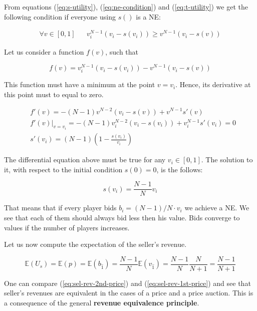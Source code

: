 From equations (\ref{eq:s-utility}), (\ref{eq:ne-condition}) and (\ref{eq:t-utility}) we get the following condition if everyone using $s()$ is a NE:

\begin{equation}
\begin{aligned}
	\forall v \in [0, 1] & & v_i^{N-1}(v_i-s(v_i)) \ge v^{N-1}(v_i-s(v))
\end{aligned}
\end{equation}

Let us consider a function $f(v)$, such that

\begin{equation}
f(v) = v_i^{N-1}(v_i-s(v_i)) - v^{N-1}(v_i-s(v))
\end{equation}

This function must have a minimum at the point $v = v_i$. Hence, its derivative at this point must to equal to zero.

\begin{equation}
\begin{aligned}
	& f'(v) = -(N-1)v^{N-2}(v_i-s(v)) + v^{N-1}s'(v) \\
	& f'(v)\big|_{v=v_i} = -(N-1)v_i^{N-2}(v_i-s(v_i)) + v_i^{N-1}s'(v_i) = 0                    \\
	& s'(v_i) = (N-1)\left(1 - \frac{s(v_i)}{v_i}\right)
\end{aligned}
\end{equation}

The differential equation above must be true for any $v_i \in [0, 1]$. The solution to it, with respect to the initial condition $s(0) = 0$, is the follows:

\begin{equation}
s(v_i) = \frac{N-1}N v_i
\end{equation} 

That means that if every player bids $b_i = (N-1)/N \cdot v_i$ we achieve a NE. We see that each of them should always bid less then his value. Bids converge to values if the number of players increases.

Let us now compute the expectation of the seller's revenue.

\begin{equation}\label{eq:sel-rev-1st-price}
\mathbb{E}(U_s) = \mathbb{E}(p) = \mathbb{E}(b_{\hat1}) = \frac{N-1}N \mathbb{E}(v_{\hat1}) = \frac{N-1}N \frac N{N+1} = \frac{N-1}{N+1}
\end{equation}

One can compare (\ref{eq:sel-rev-2nd-price}) and (\ref{eq:sel-rev-1st-price}) and see that seller's revenues are equivalent in the cases of a  price and a  price auction. This is a consequence of the general \textbf{revenue equivalence principle}.


